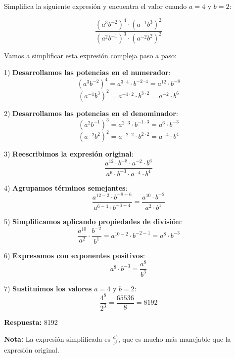 \begin{ejercicio}[
  id=MATU_ALG_005,
  materia_principal=matematicas_preuniversitaria,
  codigo_materia=MATU,
  capitulo=algebra,
  subtema=exponentes,
  nivel=intermedio,
  procedencia="Examen UNMSM 2024",
  visibilidad=web_impreso,
  tiempo_estimado=5,
  libros={algebra_pre, algebra_intermedio},
  dificultad=2,
  tags={exponentes},
  youtube_url="",
  mostrar_solucion=true,
  libro_promocion=""
]

Simplifica la siguiente expresión y encuentra el valor cuando $a = 4$ y $b = 2$:

$$\frac{(a^3 b^{-2})^4 \cdot (a^{-1} b^3)^2}{(a^2 b^{-1})^3 \cdot (a^{-2} b^2)^2}$$

\begin{solucion}

Vamos a simplificar esta expresión compleja paso a paso:

1) \textbf{Desarrollamos las potencias en el numerador}:
   $$(a^3 b^{-2})^4 = a^{3 \cdot 4} \cdot b^{-2 \cdot 4} = a^{12} \cdot b^{-8}$$
   $$(a^{-1} b^3)^2 = a^{-1 \cdot 2} \cdot b^{3 \cdot 2} = a^{-2} \cdot b^6$$

2) \textbf{Desarrollamos las potencias en el denominador}:
   $$(a^2 b^{-1})^3 = a^{2 \cdot 3} \cdot b^{-1 \cdot 3} = a^6 \cdot b^{-3}$$
   $$(a^{-2} b^2)^2 = a^{-2 \cdot 2} \cdot b^{2 \cdot 2} = a^{-4} \cdot b^4$$

3) \textbf{Reescribimos la expresión original}:
   $$\frac{a^{12} \cdot b^{-8} \cdot a^{-2} \cdot b^6}{a^6 \cdot b^{-3} \cdot a^{-4} \cdot b^4}$$

4) \textbf{Agrupamos términos semejantes}:
   $$\frac{a^{12-2} \cdot b^{-8+6}}{a^{6-4} \cdot b^{-3+4}} = \frac{a^{10} \cdot b^{-2}}{a^2 \cdot b^1}$$

5) \textbf{Simplificamos aplicando propiedades de división}:
   $$\frac{a^{10}}{a^2} \cdot \frac{b^{-2}}{b^1} = a^{10-2} \cdot b^{-2-1} = a^8 \cdot b^{-3}$$

6) \textbf{Expresamos con exponentes positivos}:
   $$a^8 \cdot b^{-3} = \frac{a^8}{b^3}$$

7) \textbf{Sustituimos los valores} $a = 4$ y $b = 2$:
   $$\frac{4^8}{2^3} = \frac{65536}{8} = 8192$$

\textbf{Respuesta:} 8192

\textbf{Nota:} La expresión simplificada es $\frac{a^8}{b^3}$, que es mucho más manejable que la expresión original.
\end{solucion}
\end{ejercicio}